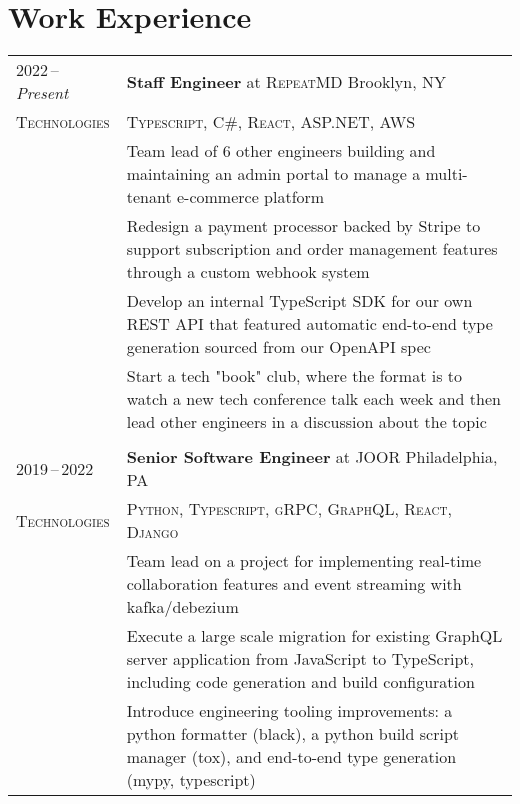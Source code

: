 \documentclass[a4paper,12pt]{article}
\begin{document}
\section{Work Experience}
\begin{tabularx}{\textwidth}{@{\extracolsep{2pt}}p{7em}|X@{}}
    2022\,--\,\emph{Present} & \textbf{Staff Engineer} at \textsc{RepeatMD} \hfill Brooklyn, NY                                                                                                             \\
    \textsc{Technologies}    & \textsc{Typescript}, \textsc{C\#}, \textsc{React}, \textsc{ASP.NET}, \textsc{AWS}                                                                                            \\
                             & \footnotesize Team lead of 6 other engineers building and maintaining an admin portal to manage a multi-tenant e-commerce platform                                           \\
                             & \footnotesize Redesign a payment processor backed by Stripe to support subscription and order management features through a custom webhook system                            \\
                             & \footnotesize Develop an internal TypeScript SDK for our own REST API that featured automatic end-to-end type generation sourced from our OpenAPI spec                       \\
                             & \footnotesize Start a tech "book" club, where the format is to watch a new tech conference talk each week and then lead other engineers in a discussion about the topic      \\

    \multicolumn{2}{c}{}                                                                                                                                                                                    \\

    2019\,--\,2022           & \textbf{Senior Software Engineer} at \textsc{JOOR} \hfill Philadelphia, PA                                                                                                   \\
    \textsc{Technologies}    & \textsc{Python}, \textsc{Typescript}, \textsc{gRPC}, \textsc{GraphQL}, \textsc{React}, \textsc{Django}                                                                       \\
                             & \footnotesize Team lead on a project for implementing real-time collaboration features and event streaming with kafka/debezium                                               \\
                             & \footnotesize Execute a large scale migration for existing GraphQL server application from JavaScript to TypeScript, including code generation and build configuration       \\
                             & \footnotesize Introduce engineering tooling improvements: a python formatter (black), a python build script manager (tox), and end-to-end type generation (mypy, typescript) \\


\end{tabularx}
\end{document}
